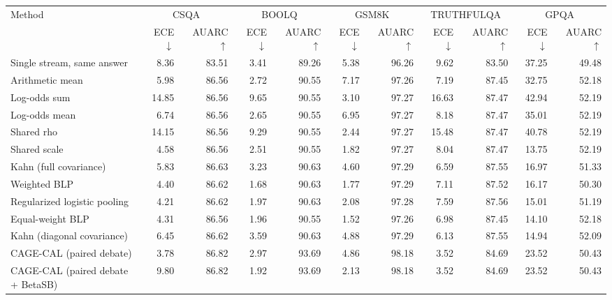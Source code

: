 \begin{tabular}{lrrrrrrrrrr}
\toprule
Method & \multicolumn{2}{c}{CSQA} & \multicolumn{2}{c}{BOOLQ} & \multicolumn{2}{c}{GSM8K} & \multicolumn{2}{c}{TRUTHFULQA} & \multicolumn{2}{c}{GPQA} \\
 & ECE $\downarrow$ & AUARC $\uparrow$ & ECE $\downarrow$ & AUARC $\uparrow$ & ECE $\downarrow$ & AUARC $\uparrow$ & ECE $\downarrow$ & AUARC $\uparrow$ & ECE $\downarrow$ & AUARC $\uparrow$ \\
\midrule
Single stream, same answer & 8.36 & 83.51 & 3.41 & 89.26 & 5.38 & 96.26 & 9.62 & 83.50 & 37.25 & 49.48 \\
Arithmetic mean & 5.98 & 86.56 & 2.72 & 90.55 & 7.17 & 97.26 & 7.19 & 87.45 & 32.75 & 52.18 \\
Log-odds sum & 14.85 & 86.56 & 9.65 & 90.55 & 3.10 & 97.27 & 16.63 & 87.47 & 42.94 & 52.19 \\
Log-odds mean & 6.74 & 86.56 & 2.65 & 90.55 & 6.95 & 97.27 & 8.18 & 87.47 & 35.01 & 52.19 \\
Shared rho & 14.15 & 86.56 & 9.29 & 90.55 & 2.44 & 97.27 & 15.48 & 87.47 & 40.78 & 52.19 \\
Shared scale & 4.58 & 86.56 & 2.51 & 90.55 & 1.82 & 97.27 & 8.04 & 87.47 & 13.75 & 52.19 \\
Kahn (full covariance) & 5.83 & 86.63 & 3.23 & 90.63 & 4.60 & 97.29 & 6.59 & 87.55 & 16.97 & 51.33 \\
Weighted BLP & 4.40 & 86.62 & 1.68 & 90.63 & 1.77 & 97.29 & 7.11 & 87.52 & 16.17 & 50.30 \\
Regularized logistic pooling & 4.21 & 86.62 & 1.97 & 90.63 & 2.08 & 97.28 & 7.59 & 87.56 & 15.01 & 51.19 \\
Equal-weight BLP & 4.31 & 86.56 & 1.96 & 90.55 & 1.52 & 97.26 & 6.98 & 87.45 & 14.10 & 52.18 \\
Kahn (diagonal covariance) & 6.45 & 86.62 & 3.59 & 90.63 & 4.88 & 97.29 & 6.13 & 87.55 & 14.94 & 52.09 \\
CAGE-CAL (paired debate) & 3.78 & 86.82 & 2.97 & 93.69 & 4.86 & 98.18 & 3.52 & 84.69 & 23.52 & 50.43 \\
CAGE-CAL (paired debate + BetaSB) & 9.80 & 86.82 & 1.92 & 93.69 & 2.13 & 98.18 & 3.52 & 84.69 & 23.52 & 50.43 \\
\bottomrule
\end{tabular}
